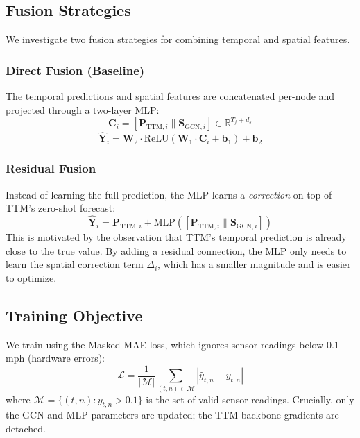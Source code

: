 \documentclass[11pt, a4paper]{article}
\begin{document}
\subsection{Fusion Strategies}

We investigate two fusion strategies for combining temporal and spatial features.

\subsubsection{Direct Fusion (Baseline)}
The temporal predictions and spatial features are concatenated per-node and projected through a two-layer MLP:
\begin{equation}
    \mathbf{C}_i = [\mathbf{P}_{\text{TTM}, i} \| \mathbf{S}_{\text{GCN}, i}] \in \mathbb{R}^{T_f + d_s}
\end{equation}
\begin{equation}
    \hat{\mathbf{Y}}_i = \mathbf{W}_2 \cdot \text{ReLU}(\mathbf{W}_1 \cdot \mathbf{C}_i + \mathbf{b}_1) + \mathbf{b}_2
\end{equation}

\subsubsection{Residual Fusion}
Instead of learning the full prediction, the MLP learns a \textit{correction} on top of TTM's zero-shot forecast:
\begin{equation}
    \hat{\mathbf{Y}}_i = \mathbf{P}_{\text{TTM}, i} + \text{MLP}([\mathbf{P}_{\text{TTM}, i} \| \mathbf{S}_{\text{GCN}, i}])
\end{equation}
This is motivated by the observation that TTM's temporal prediction is already close to the true value. By adding a residual connection, the MLP only needs to learn the spatial correction term $\Delta_i$, which has a smaller magnitude and is easier to optimize.

\subsection{Training Objective}

We train using the Masked MAE loss, which ignores sensor readings below 0.1 mph (hardware errors):
\begin{equation}
    \mathcal{L} = \frac{1}{|\mathcal{M}|} \sum_{(t,n) \in \mathcal{M}} \left| \hat{y}_{t,n} - y_{t,n} \right|
\end{equation}
where $\mathcal{M} = \{(t,n) : y_{t,n} > 0.1\}$ is the set of valid sensor readings. Crucially, only the GCN and MLP parameters are updated; the TTM backbone gradients are detached.
\end{document}
